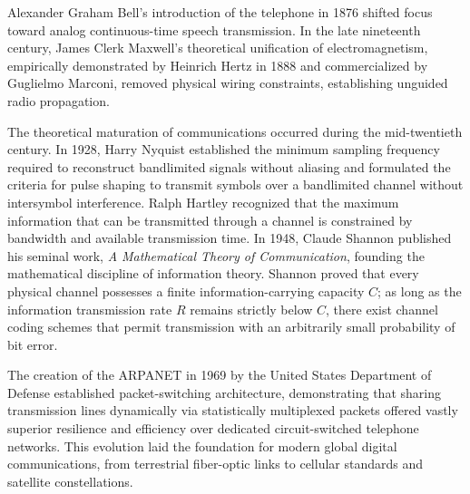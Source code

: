 \documentclass[10pt,twocolumn]{article}
\begin{document}
Alexander Graham Bell's introduction of the telephone in 1876 shifted focus toward analog continuous-time speech transmission. In the late nineteenth century, James Clerk Maxwell's theoretical unification of electromagnetism, empirically demonstrated by Heinrich Hertz in 1888 and commercialized by Guglielmo Marconi, removed physical wiring constraints, establishing unguided radio propagation. 

The theoretical maturation of communications occurred during the mid-twentieth century. In 1928, Harry Nyquist established the minimum sampling frequency required to reconstruct bandlimited signals without aliasing and formulated the criteria for pulse shaping to transmit symbols over a bandlimited channel without intersymbol interference. Ralph Hartley recognized that the maximum information that can be transmitted through a channel is constrained by bandwidth and available transmission time. In 1948, Claude Shannon published his seminal work, \textit{A Mathematical Theory of Communication}, founding the mathematical discipline of information theory. Shannon proved that every physical channel possesses a finite information-carrying capacity $C$; as long as the information transmission rate $R$ remains strictly below $C$, there exist channel coding schemes that permit transmission with an arbitrarily small probability of bit error. 

The creation of the ARPANET in 1969 by the United States Department of Defense established packet-switching architecture, demonstrating that sharing transmission lines dynamically via statistically multiplexed packets offered vastly superior resilience and efficiency over dedicated circuit-switched telephone networks. This evolution laid the foundation for modern global digital communications, from terrestrial fiber-optic links to cellular standards and satellite constellations.
\end{document}
